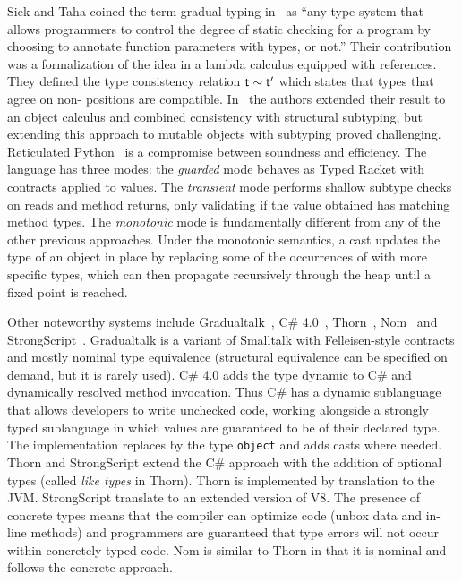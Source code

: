 \documentclass[USenglish]{tex/lipics-v2016}
\begin{document}
Siek and Taha coined the term gradual typing in~\cite{SiekTaha06} as ``any
type system that allows programmers to control the degree of static checking
for a program by choosing to annotate function parameters with types, or
not.'' Their contribution was a formalization of the idea in a lambda
calculus equipped with references. They defined the type consistency
relation $\t \sim \tp$ which states that types that agree on non-\any
positions are compatible.  In~\cite{SiekTaha07} the authors extended their
result to an object calculus and combined consistency with structural
subtyping, but extending this approach to mutable objects with subtyping
proved challenging. Reticulated Python~\cite{siek14} is a compromise between
soundness and efficiency.  The language has three modes: the \emph{guarded}
mode behaves as Typed Racket with contracts applied to values.  The
\emph{transient} mode performs shallow subtype checks on reads and method
returns, only validating if the value obtained has matching method types.
The \emph{monotonic} mode is fundamentally different from any of the other
previous approaches. Under the monotonic semantics, a cast updates the type
of an object in place by replacing some of the occurrences of \any with more
specific types, which can then propagate recursively through the heap until
a fixed point is reached.

Other noteworthy systems include Gradualtalk~\cite{GS13}, C\#
4.0~\cite{Bierman10}, Thorn~\cite{oopsla09}, Nom~\cite{Muehlboeck2017} and
Strong\-Script~\cite{ecoop15}. Gradualtalk is a variant of Smalltalk with
Felleisen-style contracts and mostly nominal type equivalence (structural
equivalence can be specified on demand, but it is rarely
used). C\# 4.0 adds the type {\sf dynamic} to C\# and dynamically resolved
method invocation. Thus C\# has a dynamic sublanguage that allows developers
to write unchecked code, working alongside a strongly typed sublanguage in
which values are guaranteed to be of their declared type.  The
implementation replaces \any by the type {\tt object} and adds casts where
needed.  Thorn and StrongScript extend the C\# approach with the addition of
optional types (called {\em like types} in Thorn).  Thorn is implemented by
translation to the JVM. StrongScript translate to an extended version of
V8. The presence of concrete types means that the compiler can optimize code
(unbox data and in-line methods) and programmers are guaranteed that type
errors will not occur within concretely typed code. Nom is similar to Thorn
in that it is nominal and follows the concrete approach.
\end{document}
